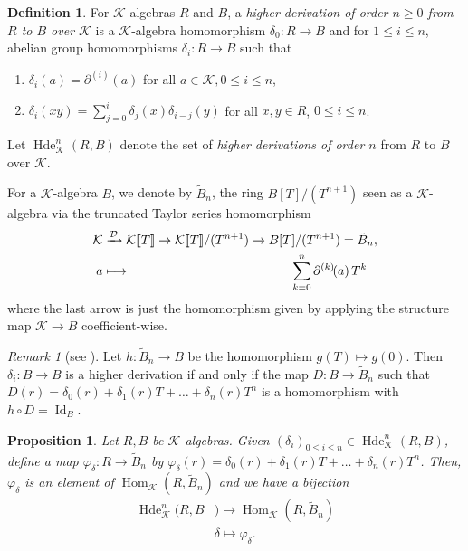 \documentclass[10pt,a4paper]{amsart}
\theoremstyle{plain} %
\newtheorem{Proposition}[Theorem]{Proposition}
\theoremstyle{definition}
\newtheorem{Definition}[Theorem]{Definition}
\theoremstyle{remark}
\newtheorem{Remark}[Theorem]{Remark}
\newcommand{\cK}{\mathcal{K}}   %
\newcommand{\Hom}{\operatorname{Hom}}
\newcommand{\Id}{\operatorname{Id}}
\newcommand{\Hde}{\operatorname{Hde}}
\newcommand{\ps}[1]{[\![#1]\!]}  %
\newcommand{\hd}[2]{\partial^{(#1)}\!\!\left(#2\right)} %
\newcommand{\hde}[1]{\partial^{(#1)}}  %
\newcommand{\D}{\mathcal{D}} %
\numberwithin{equation}{subsection}
\begin{document}
\begin{Definition}
For $\cK$-algebras $R$ and $B$, a \emph{higher derivation of order $n\geq 0$ from $R$ to $B$ over $\cK$} is a $\cK$-algebra homomorphism $\delta_0: R \rightarrow B$ and for $1\leq i \leq n$, abelian group homomorphisms $\delta_i: R \rightarrow B$ such that
\begin{enumerate}
    \item[(a)] $\delta_i(a) = \hde{i}(a)$ for all $a \in \cK, 0\leq i \leq n$,
    \item[(b)] $\delta_i(xy) = \sum_{j=0}^i \delta_j(x) \delta_{i-j}(y)$ for all $x,y\in R$, $0\leq i\leq n$.
\end{enumerate}
Let $\Hde^n_\cK(R, B)$ denote the set of \emph{higher derivations of order $n$} from $R$ to $B$ over $\cK$. 
\end{Definition}

 For a $\cK$-algebra $B$, we denote by $\tilde{B}_n$, the ring $B[T]/(T^{n+1})$ seen as a $\cK$-algebra via the truncated Taylor series homomorphism
	\begin{align} \label{eq:defintion-of-cal-D}
	\cK&\xrightarrow{\D} \cK\ps{T} 
    \to \cK\ps{T}/(T^{n+1})\to B[T]/(T^{n+1})=\tilde{B}_n,\\
    a&\longmapsto \hspace{4.5cm}\sum_{k=0}^n \hd{k}{a}T^k \notag
	\end{align}
    where the last arrow is just the homomorphism given by applying the structure map $\cK\to B$ coefficient-wise.


\begin{Remark}[{see \cite[Rem.~1.5]{er:pda}}]
Let $h:\tilde{B}_n \rightarrow B$ be the homomorphism $g(T) \mapsto g(0)$. Then $\delta_i: B \rightarrow B$ is a higher derivation if and only if the map $D: B \rightarrow \tilde{B}_n$ such that $D(r)=  \delta_0(r) + \delta_1(r)T + \dots + \delta_n(r)T^n$ is a homomorphism with $h \circ D = \Id_B$.
    \end{Remark}



 \begin{Proposition}\cite[Prop.~1.19]{er:pda}
 \label{prop:er-prop.1.19} 
     Let $R, B$ be $\cK$-algebras. Given $(\delta_i)_{0\leq i \leq n} \in \Hde_\cK^n(R,B)$, define a map $\varphi_{\delta}: R \rightarrow \tilde{B}_n$ by $\varphi_\delta(r) = \delta_0(r)+\delta_1(r)T + \dots + \delta_n(r)T^n$. Then, $\varphi_\delta$ is an element of $\Hom_\cK(R, \tilde{B}_n)$ and we have a bijection
     \begin{align*}
         \Hde_\cK^n(R,B&) \rightarrow \Hom_\cK(R, \tilde{B}_n) \\
        & \delta \mapsto \varphi_\delta.
     \end{align*}
 \end{Proposition}
\end{document}
